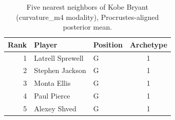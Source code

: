 \begin{table}[htbp]
  \centering\small
  \begin{tabular}{rllc}
    \toprule
    Rank & Player & Position & Archetype \\
    \midrule
    1 & Latrell Sprewell & G & 1 \\
    2 & Stephen Jackson & G & 1 \\
    3 & Monta Ellis & G & 1 \\
    4 & Paul Pierce & G & 1 \\
    5 & Alexey Shved & G & 1 \\
    \bottomrule
  \end{tabular}
  \caption{Five nearest neighbors of Kobe Bryant (curvature_m4 modality), Procrustes-aligned posterior mean.}
  \label{tab:Kobe_Bryant_neighbors_curvature_m4}
\end{table}

